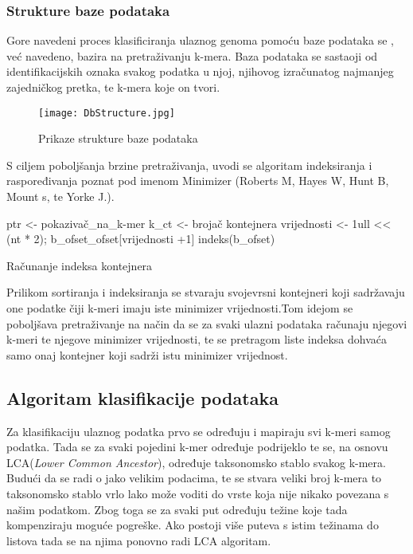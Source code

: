 \documentclass[times, utf8, zavrsni]{fer}
\begin{document}
{\subsubsection{Strukture baze podataka}
Gore navedeni proces klasificiranja ulaznog genoma pomoću baze podataka se , već navedeno, bazira na pretraživanju k-mera. Baza podataka se sastaoji od identifikacijskih oznaka svakog podatka u njoj, njihovog izračunatog najmanjeg zajedničkog pretka, te k-mera koje on tvori.\\
\begin{figure}[hbp]
	\centering
	\texttt{[image: DbStructure.jpg]}
	\caption{Prikaze strukture baze podataka}
	\label{BazaPodataka}
\end{figure}

S ciljem poboljšanja brzine pretraživanja, uvodi se algoritam indeksiranja i raspoređivanja poznat pod imenom Minimizer (Roberts M, Hayes W, Hunt B, Mount s, te Yorke J.).
 

\begin{algorithm}[H]
	ptr <- pokazivač\_na\_k-mer\;
	k\_ct <- brojač kontejnera\;
	vrijednosti <- 1ull << (nt * 2);
	b\_ofset\_ofset[vrijednosti +1]\;
	indeks(b\_ofset)\;
	\caption{Računanje indeksa kontejnera}
\end{algorithm}

Prilikom sortiranja i indeksiranja se stvaraju svojevrsni kontejneri koji sadržavaju one podatke čiji k-meri imaju iste minimizer vrijednosti.Tom idejom se poboljšava pretraživanje na način da se za svaki ulazni podataka računaju njegovi k-meri te njegove minimizer vrijednosti, te se pretragom liste indeksa dohvaća samo onaj kontejner koji sadrži istu minimizer vrijednost.


\newpage
\subsection{Algoritam klasifikacije podataka}


Za klasifikaciju ulaznog podatka prvo se određuju i mapiraju svi k-meri samog podatka. Tada se za svaki pojedini k-mer određuje podrijeklo te se, na osnovu LCA(\textit{Lower Common Ancestor}), određuje taksonomsko stablo svakog k-mera. Budući da se radi o jako velikim podacima, te se stvara veliki broj k-mera to taksonomsko stablo vrlo lako može voditi do vrste koja nije nikako povezana s našim podatkom. Zbog toga se za svaki put određuju težine koje tada kompenziraju moguće pogreške. Ako postoji više puteva s istim težinama do listova tada se na njima ponovno radi LCA algoritam.

}
\end{document}
